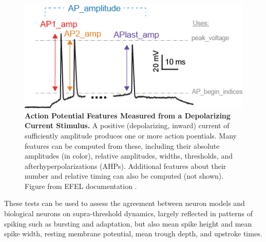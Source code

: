 \begin{figure}
\centering
\includegraphics{figures/AP_Amplitude.png}
\caption[Action Potential Features Measured from a Depolarizing Current Stimulus]{\textbf{Action Potential Features Measured from a Depolarizing Current Stimulus.} A positive (depolarizing, inward) current of sufficiently amplitude produces one or more action poentials.
Many features can be computed from these, including their absolute amplitudes (in color), relative amplitudes, widths, thresholds, and afterhyperpolarizations (AHPs).
Additional features about their number and relative timing can also be computed (not shown).
Figure from EFEL documentation \citep{efel_documentation}.}
\label{fig:features_example}
\end{figure}




These tests can be used to assess the agreement between neuron models and biological neurons on supra-threshold dynamics, largely reflected in patterns of spiking such as bursting and adaptation, but also mean spike height and mean spike width, resting membrane potential, mean trough depth, and upstroke times.

